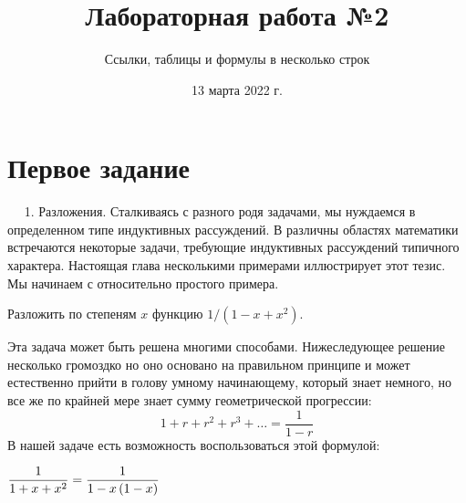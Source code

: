 \documentclass[a4paper,12pt]{article} %
\author{Ссылки, таблицы и формулы в несколько строк}
\title{Лабораторная работа №2}
\date{13 марта 2022 г.}
\begin{document}
	
	\maketitle %
	
	\section{Первое задание}	
	
	$\quad$
	1. Разложения. Сталкиваясь с разного родя задачами, мы нуждаемся в определенном типе индуктивных рассуждений. В различны областях математики встречаются некоторые задачи, требующие индуктивных рассуждений типичного характера. Настоящая глава несколькими примерами иллюстрирует этот тезис. Мы начинаем с относительно простого примера.
	
	Разложить по степеням $x$ функцию $1 / \left(1 - x + x^2 \right).$
	
	Эта задача может быть решена многими способами. Нижеследующее решение несколько громоздко но оно основано на правильном принципе и может естественно прийти в голову умному начинающему, который знает немного, но все же по крайней мере знает сумму геометрической прогрессии:
	$$1 + r + r^2 + r^3 + \dots = \frac{1}{1 - r}$$
	В нашей задаче есть возможность воспользоваться этой формулой:

	$ \dfrac{1}{1 + x + x^2 } = \dfrac{1}{1 - x \left(1 - x \right)} \\ $
	
\end{document}
